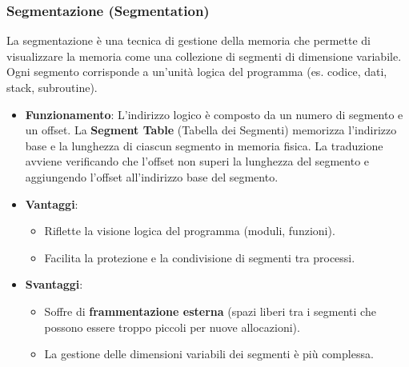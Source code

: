 \subsubsection{Segmentazione (Segmentation)}
La segmentazione è una tecnica di gestione della memoria che permette di visualizzare la memoria come una collezione di segmenti di dimensione variabile. Ogni segmento corrisponde a un'unità logica del programma (es. codice, dati, stack, subroutine).
\begin{itemize}
    \item \textbf{Funzionamento}: L'indirizzo logico è composto da un numero di segmento e un offset. La \textbf{Segment Table} (Tabella dei Segmenti) memorizza l'indirizzo base e la lunghezza di ciascun segmento in memoria fisica. La traduzione avviene verificando che l'offset non superi la lunghezza del segmento e aggiungendo l'offset all'indirizzo base del segmento.
    \item \textbf{Vantaggi}:
    \begin{itemize}
        \item Riflette la visione logica del programma (moduli, funzioni).
        \item Facilita la protezione e la condivisione di segmenti tra processi.
    \end{itemize}
    \item \textbf{Svantaggi}:
    \begin{itemize}
        \item Soffre di \textbf{frammentazione esterna} (spazi liberi tra i segmenti che possono essere troppo piccoli per nuove allocazioni).
        \item La gestione delle dimensioni variabili dei segmenti è più complessa.
    \end{itemize}
\end{itemize}

